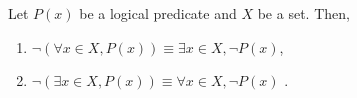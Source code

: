 \begin{theorem}
    Let $P(x)$ be a logical predicate and $X$ be a set. Then,
   \begin{enumerate}
       \item $\neg (\forall x \in X, P(x) ) \equiv \exists x\in X, \neg P(x) $,
       \item $\neg (\exists x \in X, P(x)) \equiv \forall x\in X, \neg P(x) $ .
   \end{enumerate}
\end{theorem}
